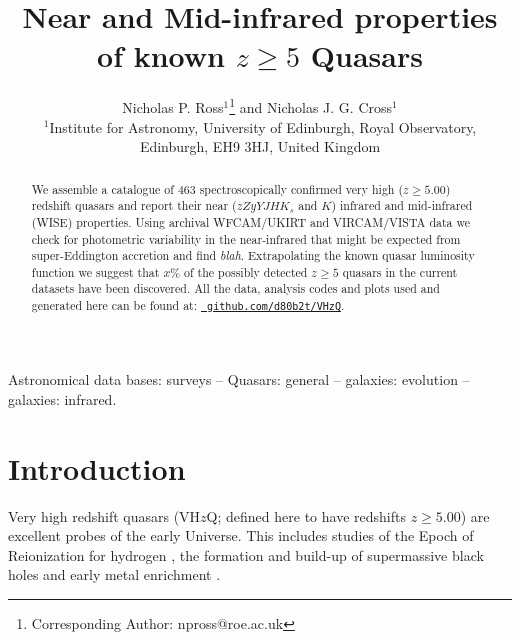 \documentclass[usenatbib]{mnras}
\begin{document}
\title[Very high-$z$ Quasars]
        {Near and Mid-infrared properties of known $z\geq5$ Quasars}
\author[Ross \& Cross]
       {Nicholas P. Ross$^{1}$\thanks{Corresponding Author: npross@roe.ac.uk} and Nicholas J. G. Cross$^{1}$
\\ 
$^1$Institute for Astronomy, University of Edinburgh, Royal Observatory, Edinburgh, EH9 3HJ, United Kingdom\\
}

\maketitle
\begin{abstract}
We assemble a catalogue of 463 spectroscopically confirmed very high
($z\geq5.00$) redshift quasars and report their near ($zZyYJHK_{s}$
and $K$) infrared and mid-infrared (WISE) properties.  Using archival
WFCAM/UKIRT and VIRCAM/VISTA data we check for photometric variability
in the near-infrared that might be expected from super-Eddington
accretion and find {\it blah}.  Extrapolating the known quasar
luminosity function we suggest that $x$\% of the possibly detected
$z\geq5$ quasars in the current datasets have been discovered.  All
the data, analysis codes and plots used and generated here can be
found at: \href{https://github.com/d80b2t/VHzQ}{\tt
github.com/d80b2t/VHzQ}.
\end{abstract}


\begin{keywords}
Astronomical data bases: surveys -- 
Quasars: general -- 
galaxies: evolution -- 
galaxies: infrared.
\end{keywords}



\section{Introduction}
Very high redshift quasars (VH$z$Q; defined here to have redshifts
$z\geq5.00$) are excellent probes of the early Universe. This includes
studies of the Epoch of Reionization for hydrogen \citep[see e.g.][for
reviews]{Fan2006review, Mortlock2016}, the formation and build-up of
supermassive black holes \citep[e.g., ][]{Rees1984, WyitheLoeb2003,
Volonteri2010, Agarwal2016, Valiante2018, Latif2018, Wise2019} and
early metal enrichment \citep[see e.g., ][]{Simcoe2012, Chen2017,
Bosman2017}.
\end{document}
